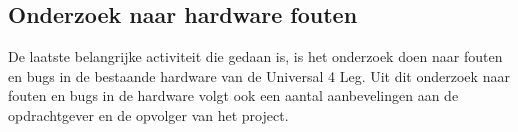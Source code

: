 \subsection{Onderzoek naar hardware fouten}
De laatste belangrijke activiteit die gedaan is, is het onderzoek doen naar fouten en bugs in de bestaande hardware van de Universal 4 Leg. Uit dit onderzoek naar fouten en bugs in de hardware volgt ook een aantal aanbevelingen aan de opdrachtgever en de opvolger van het project.